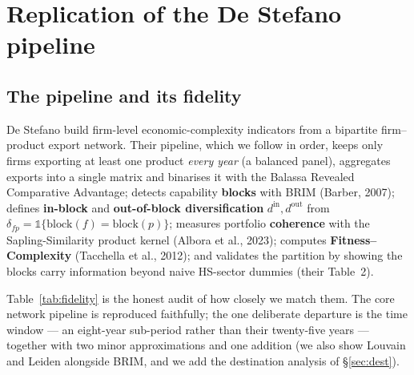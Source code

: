 \documentclass[11pt]{article}
\newcommand{\din}{d^{\mathrm{in}}}
\newcommand{\dout}{d^{\mathrm{out}}}
\begin{document}
\section{Replication of the De Stefano pipeline}

\subsection{The pipeline and its fidelity}

De Stefano build firm-level economic-complexity indicators from a bipartite firm--product export network. Their
pipeline, which we follow in order, keeps only firms exporting at least one product \emph{every year} (a
balanced panel), aggregates exports into a single matrix and binarises it with the Balassa Revealed Comparative
Advantage; detects capability \textbf{blocks} with BRIM (Barber, 2007); defines \textbf{in-block} and
\textbf{out-of-block diversification} $\din,\dout$ from $\delta_{fp}=\mathbb{1}\{\text{block}(f)=\text{block}(p)\}$;
measures portfolio \textbf{coherence} with the Sapling-Similarity product kernel (Albora et al., 2023); computes
\textbf{Fitness--Complexity} (Tacchella et al., 2012); and validates the partition by showing the blocks carry
information beyond naive HS-sector dummies (their Table~2).

Table~\ref{tab:fidelity} is the honest audit of how closely we match them. The core network pipeline is
reproduced faithfully; the one deliberate departure is the time window --- an eight-year sub-period rather than
their twenty-five years --- together with two minor approximations and one addition (we also show Louvain and
Leiden alongside BRIM, and we add the destination analysis of \S\ref{sec:dest}).
\end{document}
